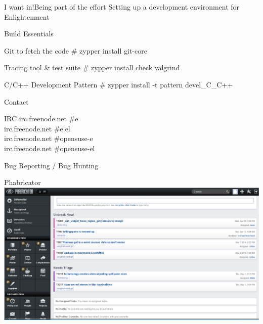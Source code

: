 \documentclass{beamer}
\begin{document}
    \begin{frame}{I want in!}{Being part of the effort}
        \center\huge Setting up a development environment for Enlightenment
    \end{frame}

    \begin{frame}{Build Essentials}
        \begin{block}{Git to fetch the code}
            \# zypper install git-core
        \end{block}
        \begin{block}{Tracing tool \& test suite}
            \# zypper install check valgrind
        \end{block}
        \begin{block}{C/C++ Development Pattern}
            \# zypper install -t pattern devel\_C\_C++
        \end{block}
    \end{frame}

    \begin{frame}{Contact}
        \begin{block}{IRC}
            irc.freenode.net    \#e \\
            irc.freenode.net    \#e.el \\
            irc.freenode.net    \#opensuse-e \\
            irc.freenode.net    \#opensuse-el
        \end{block}
    \end{frame}

    \begin{frame}{Bug Reporting / Bug Hunting}
        \begin{block}{Phabricator}
            \includegraphics[width=\linewidth]{img/phab.eps}
        \end{block}
    \end{frame}
\end{document}
